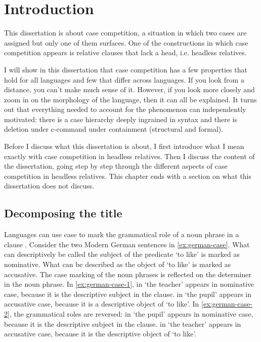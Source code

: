 
\chapter{Introduction}

This dissertation is about case competition, a situation in which two cases are assigned but only one of them surfaces. One of the constructions in which case competition appears is relative clauses that lack a head, i.e. headless relatives.

I will show in this dissertation that case competition has a few properties that hold for all languages and few that differ across languages.
If you look from a distance, you can't make much sense of it.
However, if you look more closely and zoom in on the morphology of the language, then it can all be explained.
It turns out that everything needed to account for the phenomenon can independently motivated: there is a case hierarchy deeply ingrained in syntax and there is deletion under c-command under containment (structural and formal).

Before I discuss what this dissertation is about, I first introduce what I mean exactly with case competition in headless relatives.
Then I discuss the content of the dissertation, going step by step through the different aspects of case competition in headless relatives.
This chapter ends with a section on what this dissertation does not discuss.


\section{Decomposing the title}

Languages can use case to mark the grammatical role of a noun phrase in a clause \citep[cf.][]{moravcsik2009}. Consider the two Modern German sentences in \ref{ex:german-case}. What can descriptively be called the subject of the predicate  `to like' is marked as nominative. What can be described as the object of  `to like' is marked as accusative. The case marking of the noun phrases is reflected on the determiner in the noun phrase.
In \ref{ex:german-case-1},  in  `the teacher' appears in nominative case, because it is the descriptive subject in the clause.  in  `the pupil' appears in accusative case, because it is a descriptive object of  `to like'.
In \ref{ex:german-case-2}, the grammatical roles are reversed:  in  `the pupil' appears in nominative case, because it is the descriptive subject in the clause.  in  `the teacher' appears in accusative case, because it is the descriptive object of  `to like'.

